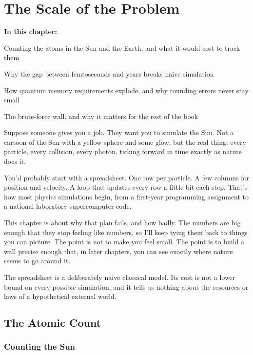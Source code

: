 \chapter{The Scale of the Problem}

\begin{chaptermapbox}
\textbf{In this chapter:}
\begin{compactchecklist}
\item Counting the atoms in the Sun and the Earth, and what it would cost to track them
\item Why the gap between femtoseconds and years breaks naive simulation
\item How quantum memory requirements explode, and why rounding errors never stay small
\item The brute-force wall, and why it matters for the rest of the book
\end{compactchecklist}
\end{chaptermapbox}

Suppose someone gives you a job. They want you to simulate the Sun. Not a cartoon of the Sun with a yellow sphere and some glow, but the real thing: every particle, every collision, every photon, ticking forward in time exactly as nature does it.

You'd probably start with a spreadsheet. One row per particle. A few columns for position and velocity. A loop that updates every row a little bit each step. That's how most physics simulations begin, from a first-year programming assignment to a national-laboratory supercomputer code.

This chapter is about why that plan fails, and how badly. The numbers are big enough that they stop feeling like numbers, so I'll keep tying them back to things you can picture. The point is not to make you feel small. The point is to build a wall precise enough that, in later chapters, you can see exactly where nature seems to go around it.

The spreadsheet is a deliberately naive classical model. Its cost is not a lower bound on every possible simulation, and it tells us nothing about the resources or laws of a hypothetical external world.

\section{The Atomic Count}

\subsection{Counting the Sun}

